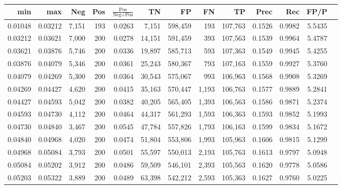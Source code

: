 \begin{tabular}{rrrrrrrrrrrrr}
\toprule
    min &     max &   Neg & Pos & $\frac{\text{Pos}}{\text{Neg}+\text{Pos}}$ &      TN &      FP &      FN &      TP &   Prec &    Rec &   FP/P \\
\midrule
0.01048 & 0.03212 & 7,151 & 193 &                                     0.0263 &   7,151 & 598,459 &     193 & 107,763 & 0.1526 & 0.9982 & 5.5435 \\
0.03212 & 0.03621 & 7,000 & 200 &                                     0.0278 &  14,151 & 591,459 &     393 & 107,563 & 0.1539 & 0.9964 & 5.4787 \\
0.03621 & 0.03876 & 5,746 & 200 &                                     0.0336 &  19,897 & 585,713 &     593 & 107,363 & 0.1549 & 0.9945 & 5.4255 \\
0.03876 & 0.04079 & 5,346 & 200 &                                     0.0361 &  25,243 & 580,367 &     793 & 107,163 & 0.1559 & 0.9927 & 5.3760 \\
0.04079 & 0.04269 & 5,300 & 200 &                                     0.0364 &  30,543 & 575,067 &     993 & 106,963 & 0.1568 & 0.9908 & 5.3269 \\
0.04269 & 0.04427 & 4,620 & 200 &                                     0.0415 &  35,163 & 570,447 &   1,193 & 106,763 & 0.1577 & 0.9889 & 5.2841 \\
0.04427 & 0.04593 & 5,042 & 200 &                                     0.0382 &  40,205 & 565,405 &   1,393 & 106,563 & 0.1586 & 0.9871 & 5.2374 \\
0.04593 & 0.04730 & 4,112 & 200 &                                     0.0464 &  44,317 & 561,293 &   1,593 & 106,363 & 0.1593 & 0.9852 & 5.1993 \\
0.04730 & 0.04840 & 3,467 & 200 &                                     0.0545 &  47,784 & 557,826 &   1,793 & 106,163 & 0.1599 & 0.9834 & 5.1672 \\
0.04840 & 0.04968 & 4,020 & 200 &                                     0.0474 &  51,804 & 553,806 &   1,993 & 105,963 & 0.1606 & 0.9815 & 5.1299 \\
0.04968 & 0.05084 & 3,793 & 200 &                                     0.0501 &  55,597 & 550,013 &   2,193 & 105,763 & 0.1613 & 0.9797 & 5.0948 \\
0.05084 & 0.05202 & 3,912 & 200 &                                     0.0486 &  59,509 & 546,101 &   2,393 & 105,563 & 0.1620 & 0.9778 & 5.0586 \\
0.05203 & 0.05322 & 3,889 & 200 &                                     0.0489 &  63,398 & 542,212 &   2,593 & 105,363 & 0.1627 & 0.9760 & 5.0225 \\

\end{tabular}
